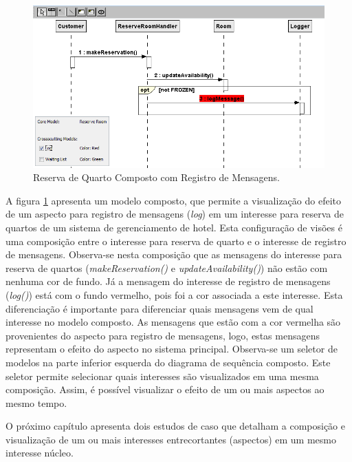 \begin{landscape}
  \begin{figure}[tb]
	\centering
	\includegraphics{img/case_study_compound_1.png}
	\caption{Reserva de Quarto Composto com Registro de Mensagens.}\label{fig:case_study_compound_1}
  \end{figure}
\end{landscape}

A figura \ref{fig:case_study_compound_1} apresenta um modelo composto, que permite a visualização do efeito de um aspecto para registro de mensagens
(\textit{log}) em um interesse para reserva de quartos de um sistema de gerenciamento de hotel. Esta configuração de visões é uma composição
entre o interesse para reserva de quarto e o interesse de registro de mensagens. Observa-se nesta composição que as mensagens do interesse para reserva de 
quartos (\textit{makeReservation()} e \textit{updateAvailability()}) não estão com nenhuma cor de fundo. Já a mensagem do interesse de registro de
mensagens (\textit{log()}) está com o fundo vermelho, pois foi a cor associada a este interesse. Esta diferenciação é importante para diferenciar quais mensagens 
vem de qual interesse no modelo composto. As mensagens que estão com a cor vermelha são provenientes do aspecto para registro de mensagens, logo,
estas mensagens representam o efeito do aspecto no sistema principal. Observa-se um seletor de modelos na parte inferior esquerda do diagrama de
sequência composto. Este seletor permite selecionar quais interesses são visualizados em uma mesma composição. Assim, é possível visualizar o efeito
de um ou mais aspectos ao mesmo tempo. 

O próximo capítulo apresenta dois estudos de caso que detalham a composição e visualização de um ou mais interesses entrecortantes (aspectos) em um
mesmo interesse núcleo.
